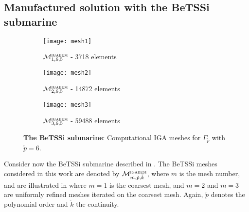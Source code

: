 \subsection{Manufactured solution with the BeTSSi submarine}
\label{Subsec3:manufactured}
\begin{figure}
	\centering
	\begin{subfigure}[t]{\textwidth}
		\texttt{[image: mesh1]}
		\caption{${\cal M}_{1,6,5}^{\textsc{igabem}}$ - 3718 elements}
	\end{subfigure} 
	\par\bigskip
	\par\bigskip
	\begin{subfigure}[t]{\textwidth}
		\texttt{[image: mesh2]}
		\caption{${\cal M}_{2,6,5}^{\textsc{igabem}}$ - 14872 elements}
	\end{subfigure} 
	\par\bigskip
	\par\bigskip
	\begin{subfigure}[t]{\textwidth}
		\texttt{[image: mesh3]}
		\caption{${\cal M}_{3,6,5}^{\textsc{igabem}}$ - 59488 elements}
	\end{subfigure} 
	\caption{\textbf{The BeTSSi submarine}: Computational IGA meshes for $\Gamma_{\check{p}}$ with $\check{p}=6$.}
	\label{Fig3:BeTSSimeshes}
\end{figure}
Consider now the BeTSSi submarine described in . The BeTSSi meshes considered in this work are denoted by ${\cal M}_{m,\check{p},\check{k}}^{\textsc{igabem}}$, where $m$ is the mesh number, and are illustrated in  where $m=1$ is the coarsest mesh, and $m=2$ and $m=3$ are uniformly refined meshes iterated on the coarsest mesh. Again, $\check{p}$ denotes the polynomial order and $\check{k}$ the continuity.

